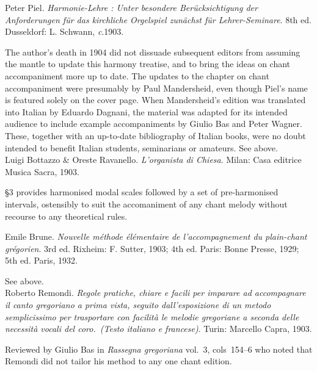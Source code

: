     \parindent=0pt
    \hangindent=0pt
  Peter Piel. \emph{Harmonie-Lehre : Unter besondere Berücksichtigung der Anforderungen für das kirchliche Orgelspiel zunächst für Lehrer-Seminare}. 8th ed. Dusseldorf:  L. Schwann, \emph{c}.1903.

     \parindent=20pt
     \hangindent=20pt
     The author's death in 1904 did not dissuade subsequent editors from assuming the mantle to update this harmony treatise, and to bring the ideas on chant accompaniment more up to date. The updates to the chapter on chant accompaniment were presumably by Paul Mandersheid, even though Piel's name is featured solely on the cover page. When Mandersheid's edition was translated into Italian by Eduardo Dagnani, the material was adapted for its intended audience to include example accompaniments by Giulio Bas and Peter Wagner. These, together with an up-to-date bibliography of Italian books, were no doubt intended to benefit Italian students, seminarians or amateurs. See  above.  \\

    \parindent=0pt
    \hangindent=0pt
  Luigi Bottazzo \& Oreste Ravanello. \emph{L'organista di Chiesa}. Milan:  Casa editrice Musica Sacra, 1903.

     \parindent=20pt
     \hangindent=20pt
     \S{}3 provides harmonised modal scales followed by a set of pre-harmonised intervals, ostensibly to suit the accomaniment of any chant melody without recourse to any theoretical rules.\\\pagebreak{}

    \parindent=0pt
    \hangindent=0pt
  Emile Brune. \emph{Nouvelle méthode élémentaire de l'accompagnement du plain-chant grégorien}. 3rd ed. Rixheim:  F. Sutter, 1903;  4th ed. Paris:  Bonne Presse, 1929;  5th ed. Paris, 1932.

     \parindent=20pt
     \hangindent=20pt
     See  above.\\

    \parindent=0pt
    \hangindent=0pt
  \covid{}Roberto Remondi. \emph{Regole pratiche, chiare e facili per imparare ad accompagnare il canto gregoriano a prima vista, seguito dall'esposizione di un metodo semplicissimo per trasportare con facilità le melodie gregoriane a seconda delle necessità vocali del coro.\ (Testo italiano e francese)}. Turin:  Marcello Capra, 1903.

     \parindent=20pt
     \hangindent=20pt
     Reviewed by Giulio Bas in \emph{Rassegna gregoriana} vol.~3, cols~154--6 who noted that Remondi did not tailor his method to any one chant edition.\\

